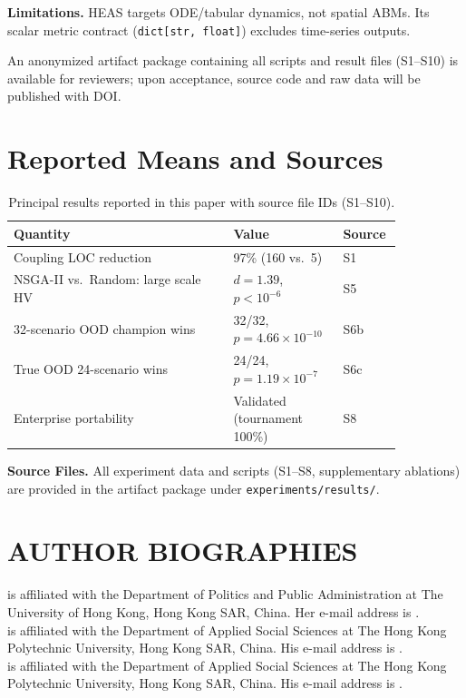 \documentclass{wscpaperproc}
\begin{document}
\textbf{Limitations.} HEAS targets ODE/tabular dynamics, not spatial ABMs. Its scalar
metric contract (\texttt{dict[str, float]}) excludes time-series outputs.

An anonymized artifact package containing all scripts and result files (S1--S10)
is available for reviewers; upon acceptance, source code and raw data will be
published with DOI.

\appendix
\section{Reported Means and Sources}

\begin{table}[ht]
\caption{Principal results reported in this paper with source file IDs (S1--S10).}
\label{tab:appendix-results}
\centering\small
\begin{tabular}{p{0.52\linewidth}p{0.23\linewidth}p{0.1\linewidth}}
\toprule
Quantity & Value & Source \\
\midrule
Coupling LOC reduction & 97\% (160 vs.\ 5) & S1 \\
NSGA-II vs.\ Random: large scale HV & $d=1.39$, $p<10^{-6}$ & S5 \\
32-scenario OOD champion wins & 32/32, $p=4.66\!\times\!10^{-10}$ & S6b \\
True OOD 24-scenario wins & 24/24, $p=1.19\!\times\!10^{-7}$ & S6c \\
Enterprise portability & Validated (tournament 100\%) & S8 \\
\bottomrule
\end{tabular}
\end{table}

\noindent\textbf{Source Files.} All experiment data and scripts (S1--S8, supplementary ablations)
are provided in the artifact package under \texttt{experiments/results/}.

\begingroup
\small


\endgroup

\section*{AUTHOR BIOGRAPHIES}

 is affiliated with the Department of Politics and Public Administration at The University of Hong Kong, Hong Kong SAR, China. Her e-mail address is .\\

 is affiliated with the Department of Applied Social Sciences at The Hong Kong Polytechnic University, Hong Kong SAR, China. His e-mail address is .\\

 is affiliated with the Department of Applied Social Sciences at The Hong Kong Polytechnic University, Hong Kong SAR, China. His e-mail address is .
\end{document}
